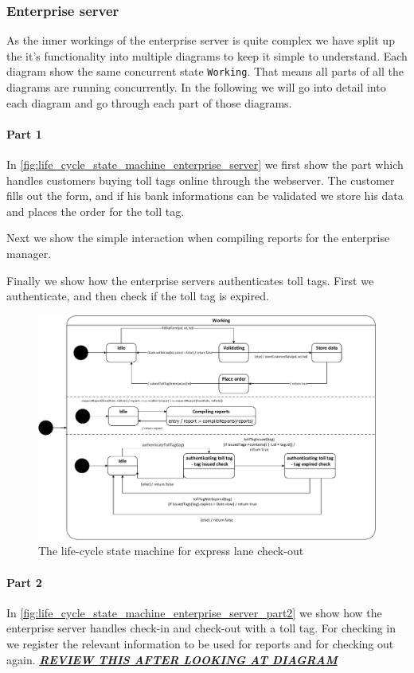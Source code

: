 \subsubsection*{Enterprise server}
As the inner workings of the enterprise server is quite complex we have split up the it's functionality into multiple diagrams to keep it simple to understand. Each diagram show the same concurrent state \texttt{Working}. That means all parts of all the diagrams are running concurrently. In the following we will go into detail into each diagram and go through each part of those diagrams.

\paragraph*{Part 1} In \autoref{fig:life_cycle_state_machine_enterprise_server} we first show the part which handles customers buying toll tags online through the webserver. The customer fills out the form, and if his bank informations can be validated we store his data and places the order for the toll tag.

Next we show the simple interaction when compiling reports for the enterprise manager.

Finally we show how the enterprise servers authenticates toll tags. First we authenticate, and then check if the toll tag is expired.

\begin{figure}[H]
\centering
\includegraphics[width=0.7\linewidth]{img/behaviour_state_machines/life_cycle_state_machines/life_cycle_state_machine_enterprise_server}
\caption{The life-cycle state machine for express lane check-out}
\label{fig:life_cycle_state_machine_enterprise_server}
\end{figure}

\paragraph*{Part 2} In \autoref{fig:life_cycle_state_machine_enterprise_server_part2} we show how the enterprise server handles check-in and check-out with a toll tag. For checking in we register the relevant information to be used for reports and for checking out again. \textit{\textbf{\underline{REVIEW THIS AFTER LOOKING AT DIAGRAM}}}

